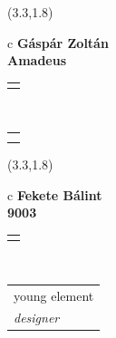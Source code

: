 \documentclass[11pt]{article}
\begin{document}
\makebox(3.3,1.8){
  \renewcommand\arraystretch{1.3}
  \begin{tabular}[c]{c}
    \hspace{8.5mm}
    \LARGE\bf{ Gáspár Zoltán }\\
    \hspace{8.5mm}
    \Large{ Amadeus }\\
    \renewcommand\arraystretch{3}
    \begin{tabular}[c]{c}
      \centering
      \fontfamily{phv}\selectfont{
        \textbf{
          \textsc{
            \scriptsize{
            \color{Bright}{ Ismerkedő }\color{Dark}{ Webmester }\color{Dark}{ Sminkmester }\color{Bright}{ Programozó }
            }
          }
        }
      }
    \end{tabular}
    \\
    \renewcommand\arraystretch{1}
    \begin{tabular}{p{3.3in}}
      \hspace{.7cm}\\
      \hspace{.7cm}\emph{  }\\
    \end{tabular}
  \end{tabular}
}

\makebox(3.3,1.8){
  \renewcommand\arraystretch{1.3}
  \begin{tabular}[c]{c}
    \hspace{8.5mm}
    \LARGE\bf{ Fekete Bálint }\\
    \hspace{8.5mm}
    \Large{ 9003 }\\
    \renewcommand\arraystretch{3}
    \begin{tabular}[c]{c}
      \centering
      \fontfamily{phv}\selectfont{
        \textbf{
          \textsc{
            \scriptsize{
            \color{Bright}{ Ismerkedő }\color{Bright}{ Webmester }\color{Bright}{ Sminkmester }\color{Bright}{ Programozó }
            }
          }
        }
      }
    \end{tabular}
    \\
    \renewcommand\arraystretch{1}
    \begin{tabular}{p{3.3in}}
      \hspace{.7cm}young element\\
      \hspace{.7cm}\emph{ designer }\\
    \end{tabular}
  \end{tabular}
}
\end{document}
